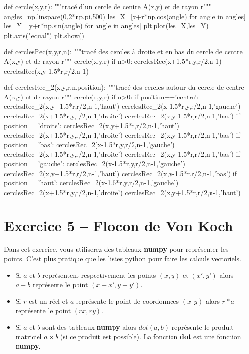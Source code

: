 \documentclass[10pt,fleqn]{article} %
\begin{document}
\begin{multicols}{2}
\begin{corrige}
\begin{python}
def cercle(x,y,r):
    """tracé d'un cercle de centre A(x,y) et de rayon r"""
    angles=np.linspace(0,2*np.pi,500)
    les_X=[x+r*np.cos(angle) for angle in angles]
    les_Y=[y+r*np.sin(angle) for angle in angles]
    plt.plot(les_X,les_Y)
    plt.axis("equal")
    plt.show()
    
def cerclesRec(x,y,r,n):
    """tracé des cercles à droite et en bas du cercle de centre A(x,y) et de rayon r"""
    cercle(x,y,r)
    if n>0:
        cerclesRec(x+1.5*r,y,r/2,n-1)
        cerclesRec(x,y-1.5*r,r/2,n-1)
        
def cerclesRec_2(x,y,r,n,position):
    """tracé des cercles autour du cercle de centre A(x,y) et de rayon r"""
    cercle(x,y,r)
    if n>0:
        if position=='centre':
            cerclesRec_2(x,y+1.5*r,r/2,n-1,'haut')
            cerclesRec_2(x-1.5*r,y,r/2,n-1,'gauche')
            cerclesRec_2(x+1.5*r,y,r/2,n-1,'droite')
            cerclesRec_2(x,y-1.5*r,r/2,n-1,'bas')
        if position=='droite':
            cerclesRec_2(x,y+1.5*r,r/2,n-1,'haut')
            cerclesRec_2(x+1.5*r,y,r/2,n-1,'droite')
            cerclesRec_2(x,y-1.5*r,r/2,n-1,'bas')
        if position=='bas':
            cerclesRec_2(x-1.5*r,y,r/2,n-1,'gauche')
            cerclesRec_2(x+1.5*r,y,r/2,n-1,'droite')
            cerclesRec_2(x,y-1.5*r,r/2,n-1,'bas')
        if position=='gauche':
            cerclesRec_2(x-1.5*r,y,r/2,n-1,'gauche')
            cerclesRec_2(x,y+1.5*r,r/2,n-1,'haut')
            cerclesRec_2(x,y-1.5*r,r/2,n-1,'bas')
        if position=='haut':
            cerclesRec_2(x-1.5*r,y,r/2,n-1,'gauche')
            cerclesRec_2(x+1.5*r,y,r/2,n-1,'droite')
            cerclesRec_2(x,y+1.5*r,r/2,n-1,'haut')
\end{python}
\end{corrige}
\else
\fi

\section*{Exercice 5 -- Flocon de Von Koch}
\setcounter{exo}{0}


Dans cet exercice, vous utiliserez des tableaux \textbf{numpy} pour représenter les points. C'est plus pratique que les listes python pour faire les calculs vectoriels.

\begin{itemize}
\item Si $a$ et $b$ représentent respectivement les points $(x,y)$ et $(x',y')$ alors $a+b$ représente le point $(x+x',y+y')$.
\item Si $r$ est un réel et $a$ représente le point de coordonnées $(x,y)$ alors $r*a$ représente le point $(rx,ry)$.
\item Si $a$ et $b$ sont des tableaux \textbf{numpy} alors $dot(a,b)$ représente le produit matriciel $a\times b$ (si ce produit est possible). La fonction \textbf{dot} est une fonction \textbf{numpy}.
\end{itemize}


\end{multicols}
\end{document}
